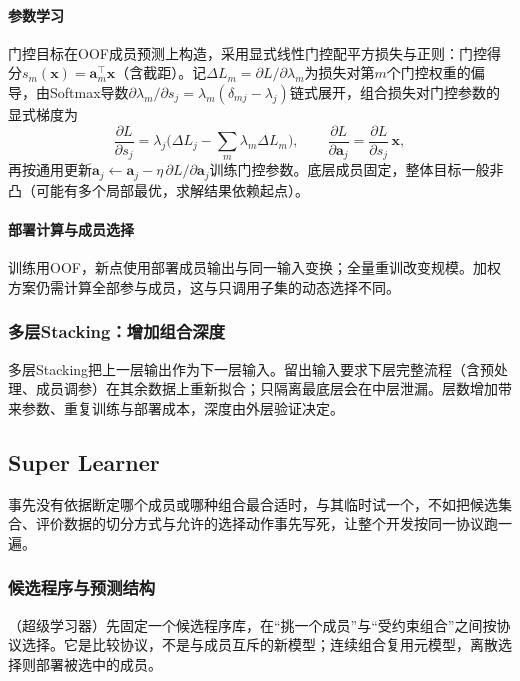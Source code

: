 \paragraph{参数学习}
门控目标在OOF成员预测上构造，采用显式线性门控配平方损失与正则：门控得分$s_m(\bm x)=\bm a_m^\top\bm x$（含截距）。记$\Delta L_m=\partial L/\partial\lambda_m$为损失对第$m$个门控权重的偏导，由Softmax导数$\partial\lambda_m/\partial s_j=\lambda_m(\delta_{mj}-\lambda_j)$链式展开，组合损失对门控参数的显式梯度为
\begin{equation}
  \frac{\partial L}{\partial s_j}
    =\lambda_j\Big(\Delta L_j-\sum_m\lambda_m\Delta L_m\Big),
  \qquad
  \frac{\partial L}{\partial\bm a_j}
    =\frac{\partial L}{\partial s_j}\,\bm x,
  \label{eq:ensemble-gating-grad}
\end{equation}
再按通用更新$\bm a_j\leftarrow\bm a_j-\eta\,\partial L/\partial\bm a_j$训练门控参数。底层成员固定，整体目标一般非凸（可能有多个局部最优，求解结果依赖起点）。

\paragraph{部署计算与成员选择}
训练用OOF，新点使用部署成员输出与同一输入变换；全量重训改变规模。加权方案仍需计算全部参与成员，这与只调用子集的动态选择不同。

\subsubsection{多层Stacking：增加组合深度}
\label{sec:ensemble-stacking-multilevel}
多层Stacking把上一层输出作为下一层输入。留出输入要求下层完整流程（含预处理、成员调参）在其余数据上重新拟合；只隔离最底层会在中层泄漏。层数增加带来参数、重复训练与部署成本，深度由外层验证决定。

\subsection{Super Learner}
\label{sec:ensemble-super-learner}

事先没有依据断定哪个成员或哪种组合最合适时，与其临时试一个，不如把候选集合、评价数据的切分方式与允许的选择动作事先写死，让整个开发按同一协议跑一遍。

\subsubsection{候选程序与预测结构}
（超级学习器）先固定一个候选程序库，在“挑一个成员”与“受约束组合”之间按协议选择。它是比较协议，不是与成员互斥的新模型；连续组合复用元模型，离散选择则部署被选中的成员。


